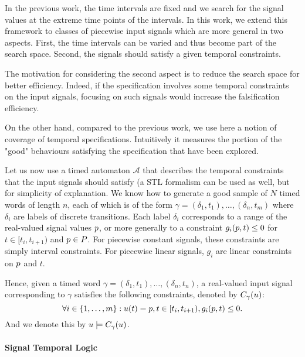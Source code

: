 In the previous work, the time intervals are fixed and we search for the signal values at the extreme time points of the intervals. In this work, we extend this framework to classes of piecewise input signals which are more general in two aspects. First, the time intervals can be varied and thus become part of the search space. Second, the signals should satisfy a given temporal constraints. 


The motivation for considering the second aspect is to reduce the search space for better efficiency. Indeed, if the specification involves some temporal constraints on the input signals, focusing on such signals would increase the falsification efficiency. 

On the other hand, compared to the previous work, we use here a notion of coverage of temporal specifications. Intuitively it measures the portion of the "good" behaviours satisfying the specification that have been explored.


Let us now use a timed automaton $\mathcal{A}$ that describes the temporal constraints that the input signals should satisfy (a STL formalism can be used as well, but for simplicity of explanation. We know how to generate a good sample of $N$ timed words of length $n$, each of which is of the form $\gamma = (\delta_1, t_1), \ldots, (\delta_n, t_m)$ where $\delta_i$ are labels of discrete transitions. Each label $\delta_i$ corresponds to a range of the real-valued signal values $p$, or more generally to a constraint $g_i(p, t) \le 0$ for $t \in [t_i, t_{i+1})$ and $p \in P$. For piecewise constant signals, these constraints are simply interval constraints. For piecewise linear signals, $g_i$ are linear constraints on $p$ and $t$. 

Hence, given a timed word $\gamma = (\delta_1, t_1), \ldots, (\delta_n, t_n)$, a real-valued input signal corresponding to $\gamma$ satisfies the following constraints, denoted by $C_{\gamma}(u)$:
$$\forall i \in \{1, \ldots, m \}: u (t)= p, t \in [t_i, t_{i+1}), g_i(p,t)  \le 0.$$
And we denote this by $u \models C_{\gamma}(u)$.

\paragraph{Signal Temporal Logic} 

